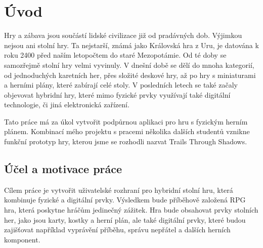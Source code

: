 \chapter{Úvod}
Hry a zábava jsou součástí lidské civilizace již od pradávných dob. Výjimkou nejsou ani stolní hry. Ta nejstarší, známá jako Královská hra z Uru\cite{royal_game_of_ur}, je datována k roku 2400 před naším letopočtem do staré Mezopotámie. Od té doby se samozřejmě stolní hry velmi vyvinuly. V dnešní době se dělí do mnoha kategorií, od jednoduchých karetních her, přes složité deskové hry, až po hry s miniaturami a herními plány, které zabírají celé stoly. V posledních letech se také začaly objevovat hybridní hry, které mimo fyzické prvky využívají také digitální technologie, či jiná elektronická zařízení.

Tato práce má za úkol vytvořit podpůrnou aplikaci pro hru s fyzickým herním plánem. Kombinací mého projektu s pracemi několika dalších studentů vznikne funkční prototyp hry, kterou jsme se rozhodli nazvat Trails Through Shadows.

\section{Účel a motivace práce}
Cílem práce je vytvořit uživatelské rozhraní pro hybridní stolní hru, která kombinuje fyzické a digitální prvky. Výsledkem bude příběhově založená RPG hra, která poskytne hráčům jedinečný zážitek. Hra bude obsahovat prvky stolních her, jako jsou karty, kostky a herní plán, ale také digitální prvky, které budou zajišťovat například vyprávění příběhu, správu nepřátel a dalších herních komponent.